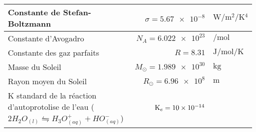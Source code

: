 \documentclass[10pt,a4paper,titlepage,landscape]{article}
\begin{document}
\begin{table}[H]
\begin{tabular}{@{}|l||r|l|}
                Constante de Stefan-Boltzmann & $\sigma = \num{5,67e-8} $ & $\unit{\watt\per\meter\squared\per\kelvin^4}$ \\ \hline 
                Constante d'Avogadro & $N_A = \num{6,022e23} $ & $\unit{\per\mole}$ \\ \hline 
                Constante des gaz parfaits & $R = \num{8,31} $ & $\unit{\joule\per\mole\per\kelvin}$ \\ \hline 
                Masse du Soleil & $M_\odot = \num{1,989e30} $ & $\unit{\kilogram}$ \\ \hline  
                Rayon moyen du Soleil & $R_\odot = \num{6,96e8} $ & $\unit{\meter}$ \\ \hline
                K standard de la réaction d'autoprotolise de l'eau ($2H_2 O_{(l)} \leftrightharpoons H_3O^+_{(aq)} + HO^-_{(aq)}$) & $\mathrm{K}_e= \num{10e{-14}}$ & \\ \hline
            \end{tabular}
    \end{table}
\end{document}
